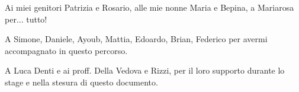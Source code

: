 \begin{flushright}
Ai miei genitori Patrizia e Rosario, alle mie nonne Maria e Bepina, a Mariarosa per... tutto!

\bigskip

A Simone, Daniele, Ayoub, Mattia, Edoardo, Brian, Federico per avermi accompagnato in questo percorso.

\bigskip

A Luca Denti e ai proff. Della Vedova e Rizzi, per il loro supporto durante lo stage e nella stesura di questo documento.

\end{flushright}